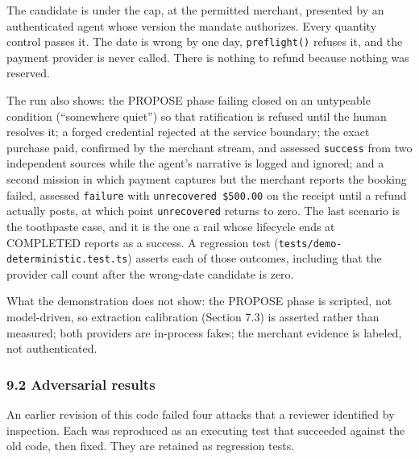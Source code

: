 \documentclass[
  11pt,
  letterpaper,
]{article}
\begin{document}
The candidate is under the cap, at the permitted merchant, presented by
an authenticated agent whose version the mandate authorizes. Every
quantity control passes it. The date is wrong by one day,
\texttt{preflight()} refuses it, and the payment provider is never
called. There is nothing to refund because nothing was reserved.

The run also shows: the PROPOSE phase failing closed on an untypeable
condition (``somewhere quiet'') so that ratification is refused until
the human resolves it; a forged credential rejected at the service
boundary; the exact purchase paid, confirmed by the merchant stream, and
assessed \texttt{success} from two independent sources while the agent's
narrative is logged and ignored; and a second mission in which payment
captures but the merchant reports the booking failed, assessed
\texttt{failure} with \texttt{unrecovered\ \$500.00} on the receipt
until a refund actually posts, at which point \texttt{unrecovered}
returns to zero. The last scenario is the toothpaste case, and it is the
one a rail whose lifecycle ends at COMPLETED reports as a success. A
regression test (\texttt{tests/demo-deterministic.test.ts}) asserts each
of those outcomes, including that the provider call count after the
wrong-date candidate is zero.

What the demonstration does not show: the PROPOSE phase is scripted, not
model-driven, so extraction calibration (Section 7.3) is asserted rather
than measured; both providers are in-process fakes; the merchant
evidence is labeled, not authenticated.

\subsubsection{9.2 Adversarial results}\label{adversarial-results}

An earlier revision of this code failed four attacks that a reviewer
identified by inspection. Each was reproduced as an executing test that
succeeded against the old code, then fixed. They are retained as
regression tests.
\end{document}

